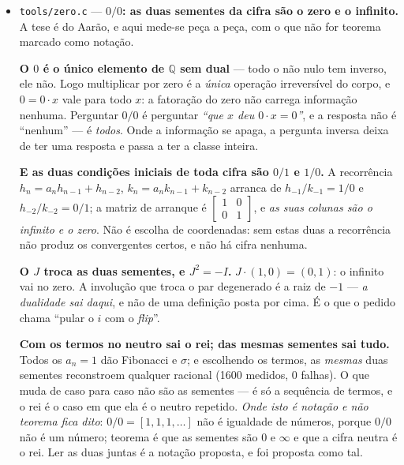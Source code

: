 \documentclass[11pt]{article}
\newcommand{\code}[1]{\texttt{\small #1}}
\theoremstyle{plain}
\theoremstyle{remark}
\begin{document}
\begin{itemize}
\textbf{E é isso que o furo em $n=5$ separa.} A fatoração
$x^5-x^4-1 = (x^2-x+1)(x^3-x-1)$ verifica-se exata, e os dois fatores são exatamente as duas
pontas: o sexto ciclotómico ($\Delta=-3$, ordem $6$, raízes na borda --- o esquilo) e o plástico
(Pisot, $1{,}3247$ --- o gato). Em toda outra dimensão vêm fundidos num irredutível só, e um corpo
não sobrevive a ser dois. \emph{Dizer que a teoria hipercomplexa já continha os complexos seria
verdade pela metade: ela contém a família que os cruza, e o cruzamento tem endereço --- $n=5$.}

\item \code{tools/zero.c} --- \textbf{$0/0$: as duas sementes da cifra são o zero e o
infinito.} A tese é do Aarão, e aqui mede-se peça a peça, com o que não for teorema marcado como
notação.

\textbf{O $0$ é o único elemento de $\mathbb{Q}$ sem dual} --- todo o não nulo tem inverso, ele
não. Logo multiplicar por zero é a \emph{única} operação irreversível do corpo, e $0 = 0\cdot x$
vale para todo $x$: a fatoração do zero não carrega informação nenhuma. Perguntar $0/0$ é
perguntar \emph{``que $x$ deu $0\cdot x = 0$''}, e a resposta não é ``nenhum'' --- é
\emph{todos}. Onde a informação se apaga, a pergunta inversa deixa de ter uma resposta e passa a
ter a classe inteira.

\textbf{E as duas condições iniciais de toda cifra são $0/1$ e $1/0$.} A recorrência
$h_n = a_n h_{n-1} + h_{n-2}$, $k_n = a_n k_{n-1} + k_{n-2}$ arranca de $h_{-1}/k_{-1} = 1/0$ e
$h_{-2}/k_{-2} = 0/1$; a matriz de arranque é $\left[\begin{smallmatrix}1&0\\0&1\end{smallmatrix}
\right]$, e \emph{as suas colunas são o infinito e o zero}. Não é escolha de coordenadas: sem
estas duas a recorrência não produz os convergentes certos, e não há cifra nenhuma.

\textbf{O $J$ troca as duas sementes, e $J^2 = -I$.} $J\cdot(1,0) = (0,1)$: o infinito vai no zero.
A involução que troca o par degenerado é a raiz de $-1$ --- \emph{a dualidade sai daqui}, e não de
uma definição posta por cima. É o que o pedido chama ``pular o $i$ com o \emph{flip}''.

\textbf{Com os termos no neutro sai o rei; das mesmas sementes sai tudo.} Todos os $a_n = 1$ dão
Fibonacci e $\sigma$; e escolhendo os termos, as \emph{mesmas} duas sementes reconstroem qualquer
racional (1600 medidos, $0$ falhas). O que muda de caso para caso não são as sementes --- é só a
sequência de termos, e o rei é o caso em que ela é o neutro repetido. \emph{Onde isto é notação e
não teorema fica dito}: $0/0 = [1,1,1,\ldots]$ não é igualdade de números, porque $0/0$ não é um
número; teorema é que as sementes são $0$ e $\infty$ e que a cifra neutra é o rei. Ler as duas
juntas é a notação proposta, e foi proposta como tal.


\end{itemize}
\end{document}
